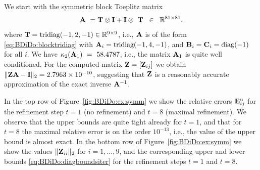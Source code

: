 \begin{example}\label{ex:BDiDo:symm}{\textrm
We start with the symmetric block Toeplitz matrix
\begin{equation}\label{eq:BDiDo:kronA}
\mathbf{A}~=\mathbf{T}\otimes \mathbf{I}+ \mathbf{I}\otimes~\mathbf{T} \;\;\in\;\;\mathbb{R}^{81\times 81},
\end{equation}
where $\mathbf{T}=\textnormal{tridiag}(-1,2,-1)\in\mathbb{R}^{9\times 9}$, i.e., $\mathbf{A}$
is of the form \eqref{eq:BDiDo:blocktridiag} with
$\mathbf{A}_i=\textnormal{tridiag}(-1,4,-1)$, and $\mathbf{B}_i=\mathbf{C}_i=\textnormal{diag}(-1)$ for
all $i$. We have $\kappa_2(\mathbf{A}_1)~=~58.4787$, i.e., the matrix $\mathbf{A}_1$ is quite
well conditioned. For the computed matrix $\mathbf{Z}=[\mathbf{Z}_{ij}]$ we obtain
$\|\mathbf{Z}\mathbf{A}-\mathbf{I}\|_2=2.7963\times 10^{-10}$, suggesting that $\mathbf{Z}$ is a reasonably
accurate approximation of the exact inverse $\mathbf{A}^{-1}$.

In the top row of \textnormal{Figure~\ref{fig:BDiDo:ex:symm}} we show the
relative errors $\mathbf{E}^{\textnormal{u}}_{ij}$ for the refinement step
\textnormal{$t=1$} (no refinement) and \textnormal{$t=8$} (maximal refinement).
We observe that the upper bounds are quite tight already for $t=1$, and that
for $t=8$ the maximal relative error is on the order $10^{-13}$, i.e., the
value of the upper bound is almost exact. In the bottom row of
\textnormal{Figure~\ref{fig:BDiDo:ex:symm}} we show the values $\|\mathbf{Z}_{ii}\|_2$
for $i=1,\dots,9$, and the corresponding upper and lower bounds
\eqref{eq:BDiDo:diagboundsiter} for the refinement steps \textnormal{$t=1$} and \textnormal{$t=8$}.

}
\end{example}
